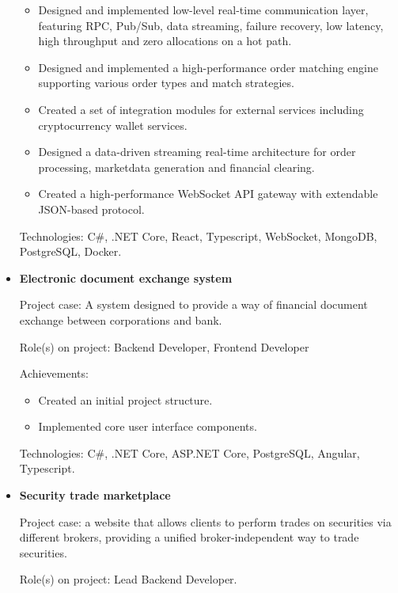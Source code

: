 \documentclass{article}
\begin{document}
\begin{itemize}
{            \begin{itemize}
                \item Designed and implemented low-level real-time communication layer, featuring RPC, Pub/Sub, data streaming, failure recovery, low latency, high throughput and zero allocations on a hot path.
                \item Designed and implemented a high-performance order matching engine supporting various order types and match strategies.
                \item Created a set of integration modules for external services including cryptocurrency wallet services.
                \item Designed a data-driven streaming real-time architecture for order processing, marketdata generation and financial clearing.
                \item  Created a high-performance WebSocket API gateway with extendable JSON-based protocol.
            \end{itemize}
        
        Technologies: C\#, .NET Core, React, Typescript, WebSocket, MongoDB, PostgreSQL, Docker.
    }
    \item {
        \textbf{Electronic document exchange system}
        
        Project case: A system designed to provide a way of financial document exchange between corporations and bank.
        
        Role(s) on project: Backend Developer, Frontend Developer
        
        Achievements:
        
            \begin{itemize}
                \item Created an initial project structure.
                \item Implemented core user interface components.
            \end{itemize}
        
        Technologies: C\#, .NET Core, ASP.NET Core, PostgreSQL, Angular, Typescript.
    }
    \item {
        \textbf{Security trade marketplace}
        
        Project case: a website that allows clients to perform trades on securities via different brokers,
        providing a unified broker-independent way to trade securities.
        
        Role(s) on project: Lead Backend Developer.
        
}
\end{itemize}
\end{document}
